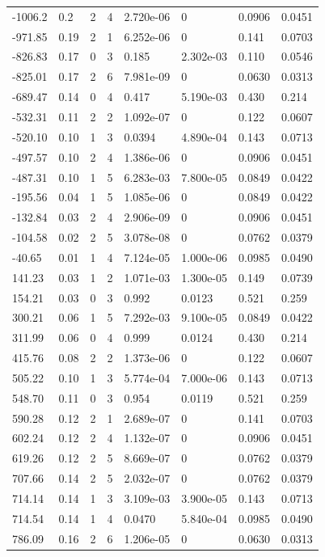 \documentclass[preview]{standalone}
\begin{document}
{{\begin{tabular}{L{1.2cm}C{1.2cm} C{0.3cm}C{0.5cm} C{1.4cm}C{1.4cm} C{1.4cm}C{1.4cm}}
  -1006.2  &   0.2  & 2     &  4 &  2.720e-06  & 0  & 0.0906 &  0.0451   \\ 
  -971.85  &  0.19  & 2     &  1 &  6.252e-06  & 0  & 0.141 &  0.0703   \\ 
  -826.83  &  0.17  & 0     &  3 &  0.185  & 2.302e-03  & 0.110 &  0.0546   \\ 
  -825.01  &  0.17  & 2     &  6 &  7.981e-09  & 0  & 0.0630 &  0.0313   \\ 
  -689.47  &  0.14  & 0     &  4 &  0.417  & 5.190e-03  & 0.430 &  0.214   \\ 
  -532.31  &  0.11  & 2     &  2 &  1.092e-07  & 0  & 0.122 &  0.0607   \\ 
  -520.10  &  0.10  & 1     &  3 &  0.0394  & 4.890e-04  & 0.143 &  0.0713   \\ 
  -497.57  &  0.10  & 2     &  4 &  1.386e-06  & 0  & 0.0906 &  0.0451   \\ 
  -487.31  &  0.10  & 1     &  5 &  6.283e-03  & 7.800e-05  & 0.0849 &  0.0422   \\ 
  -195.56  &  0.04  & 1     &  5 &  1.085e-06  & 0  & 0.0849 &  0.0422   \\ 
  -132.84  &  0.03  & 2     &  4 &  2.906e-09  & 0  & 0.0906 &  0.0451   \\ 
  -104.58  &  0.02  & 2     &  5 &  3.078e-08  & 0  & 0.0762 &  0.0379   \\ 
  -40.65  &  0.01  & 1     &  4 &  7.124e-05  & 1.000e-06  & 0.0985 &  0.0490   \\ 
  141.23  &  0.03  & 1     &  2 &  1.071e-03  & 1.300e-05  & 0.149 &  0.0739   \\ 
  154.21  &  0.03  & 0     &  3 &  0.992  & 0.0123  & 0.521 &  0.259   \\ 
  300.21  &  0.06  & 1     &  5 &  7.292e-03  & 9.100e-05  & 0.0849 &  0.0422   \\ 
  311.99  &  0.06  & 0     &  4 &  0.999  & 0.0124  & 0.430 &  0.214   \\ 
  415.76  &  0.08  & 2     &  2 &  1.373e-06  & 0  & 0.122 &  0.0607   \\ 
  505.22  &  0.10  & 1     &  3 &  5.774e-04  & 7.000e-06  & 0.143 &  0.0713   \\ 
  548.70  &  0.11  & 0     &  3 &  0.954  & 0.0119  & 0.521 &  0.259   \\ 
  590.28  &  0.12  & 2     &  1 &  2.689e-07  & 0  & 0.141 &  0.0703   \\ 
  602.24  &  0.12  & 2     &  4 &  1.132e-07  & 0  & 0.0906 &  0.0451   \\ 
  619.26  &  0.12  & 2     &  5 &  8.669e-07  & 0  & 0.0762 &  0.0379   \\ 
  707.66  &  0.14  & 2     &  5 &  2.032e-07  & 0  & 0.0762 &  0.0379   \\ 
  714.14  &  0.14  & 1     &  3 &  3.109e-03  & 3.900e-05  & 0.143 &  0.0713   \\ 
  714.54  &  0.14  & 1     &  4 &  0.0470  & 5.840e-04  & 0.0985 &  0.0490   \\ 
  786.09  &  0.16  & 2     &  6 &  1.206e-05  & 0  & 0.0630 &  0.0313   \\ 
\hline 
\end{tabular} 

}}
\end{document}
